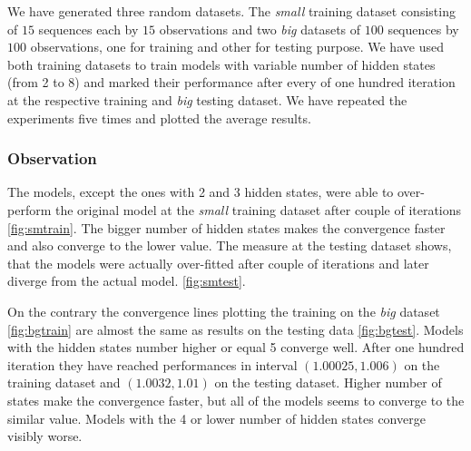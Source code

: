\documentclass[thesis=M,english]{FITthesis}[2012/10/20]
\begin{document}
We have generated three random datasets. The \textit{small} training dataset consisting of $15$ sequences each by $15$ observations and two \textit{big} datasets of $100$ sequences by $100$ observations, one for training and other for testing purpose. We have used both training datasets to train models with variable number of hidden states (from 2 to 8) and marked their performance after every of one hundred iteration at the respective training and \textit{big} testing dataset. We have repeated the experiments five times and plotted the average results.   

\subsubsection*{ Observation }

The models, except the ones with 2 and 3 hidden states, were able to over-perform the original model at the \textit{small} training dataset after couple of iterations \ref{fig:smtrain}. The bigger number of hidden states makes the convergence faster and also converge to the lower value. The measure at the testing dataset shows, that the models were actually over-fitted after couple of iterations and later diverge from the actual model. \ref{fig:smtest}. 

On the contrary the convergence lines plotting the training on the \textit{big} dataset \ref{fig:bgtrain} are almost the same as results on the testing data \ref{fig:bgtest}. Models with the hidden states number higher or equal 5 converge well. After one hundred iteration they have reached performances in interval $(1.00025,1.006)$ on the training dataset and $(1.0032,1.01)$ on the testing dataset. Higher number of states make the convergence faster, but all of the models seems to converge to the similar value. Models with the 4 or lower number of hidden states converge visibly worse. 
\end{document}
